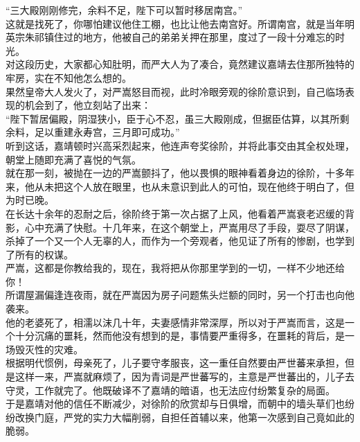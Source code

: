 \begin{multicols}{\theparacolNo}
“三大殿刚刚修完，余料不足，陛下可以暂时移居南宫。”\\

这就是找死了，你哪怕建议他住工棚，也比让他去南宫好。所谓南宫，就是当年明英宗朱祁镇住过的地方，他被自己的弟弟关押在那里，度过了一段十分难忘的时光。\\

对这段历史，大家都心知肚明，而严大人为了凑合，竟然建议嘉靖去住那所独特的牢房，实在不知他怎么想的。\\

果然皇帝大人发火了，对严嵩怒目而视，此时冷眼旁观的徐阶意识到，自己临场表现的机会到了，他立刻站了出来：\\

“陛下暂居偏殿，阴湿狭小，臣于心不忍，虽三大殿刚成，但据臣估算，以其所剩余料，足以重建永寿宫，三月即可成功。”\\

听到这话，嘉靖顿时兴高采烈起来，他连声夸奖徐阶，并将此事交由其全权处理，朝堂上随即充满了喜悦的气氛。\\

就在那一刻，被抛在一边的严嵩颤抖了，他以畏惧的眼神看着身边的徐阶，十多年来，他从未把这个人放在眼里，也从未意识到此人的可怕，现在他终于明白了，但为时已晚。\\

在长达十余年的忍耐之后，徐阶终于第一次占据了上风，他看着严嵩衰老迟缓的背影，心中充满了快慰。十几年来，在这个朝堂上，严嵩用尽了手段，耍尽了阴谋，杀掉了一个又一个人无辜的人，而作为一个旁观者，他见证了所有的惨剧，也学到了所有的权谋。\\

严嵩，这都是你教给我的，现在，我将把从你那里学到的一切，一样不少地还给你！\\

所谓屋漏偏逢连夜雨，就在严嵩因为房子问题焦头烂额的同时，另一个打击也向他袭来。\\

他的老婆死了，相濡以沫几十年，夫妻感情非常深厚，所以对于严嵩而言，这是一个十分沉痛的噩耗，然而他没有想到的是，事情要严重得多，在噩耗的背后，是一场毁灭性的灾难。\\

根据明代惯例，母亲死了，儿子要守孝服丧，这一重任自然要由严世蕃来承担，但是这样一来，严嵩就麻烦了，因为青词是严世蕃写的，主意是严世蕃出的，儿子去守灵，工作就完了。他既破译不了嘉靖的暗语，也无法应付纷繁复杂的局面。\\

于是嘉靖对他的信任不断减少，对徐阶的欣赏却与日俱增，而朝中的墙头草们也纷纷改换门庭，严党的实力大幅削弱，自担任首辅以来，他第一次感到自己竟如此的脆弱。\\


\end{multicols}
